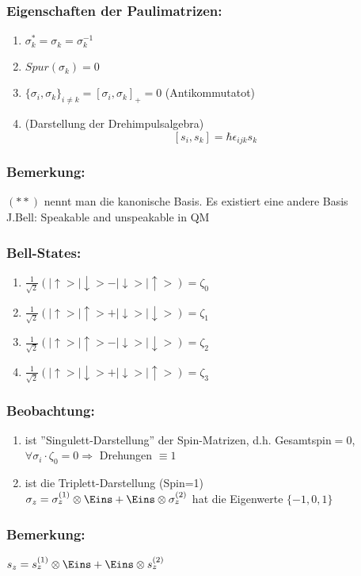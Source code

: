 \documentclass[twoside,a4paper]{scrartcl}
\renewcommand{\1}{\mathds{1}}
\newcommand{\Ra}{\Rightarrow}
\begin{document}
\subsubsection*{Eigenschaften der Paulimatrizen:}
\begin{enumerate}
\item $\sigma_k^*=\sigma_k=\sigma_k^{-1}$
\item $Spur(\sigma_k)=0$
\item $\{\sigma_i, \sigma_k\}_{i\neq k}=[\sigma_i, \sigma_k]_+=0$ (Antikommutatot)
\item (Darstellung der Drehimpulsalgebra)
$$[s_i,s_k]=\hbar \epsilon_{ijk} s_k$$
\end{enumerate}
\subsubsection*{Bemerkung:}
$(**)$ nennt man die kanonische Basis. Es existiert eine andere Basis\\
J.Bell: Speakable and unspeakable in QM
\subsubsection*{Bell-States:}
\begin{enumerate}
\item $\frac{1}{\sqrt{2}}(|\uparrow>|\downarrow>-|\downarrow>|\uparrow>)=\zeta_0$
\item $\frac{1}{\sqrt{2}}(|\uparrow>|\uparrow>+|\downarrow>|\downarrow>)=\zeta_1$
\item $\frac{1}{\sqrt{2}}(|\uparrow>|\uparrow>-|\downarrow>|\downarrow>)=\zeta_2$
\item $\frac{1}{\sqrt{2}}(|\uparrow>|\downarrow>+|\downarrow>|\uparrow>)=\zeta_3$
\end{enumerate}
\subsubsection*{Beobachtung:}
\begin{enumerate}
\item ist ''Singulett-Darstellung'' der Spin-Matrizen, d.h. Gesamtspin$=0$, $\forall \sigma_i \cdot \zeta_0=0 \Ra $ Drehungen $\equiv 1$
\item ist die Triplett-Darstellung (Spin=1)\\
$\sigma_z=\sigma_z^{(1)}\otimes \Eins+\Eins\otimes \sigma_z^{(2)}$ hat die Eigenwerte $\{-1,0,1\}$
\end{enumerate}
\subsubsection*{Bemerkung:}
$s_z=s_z^{(1)}\otimes \Eins+\Eins\otimes s_z^{(2)}$
\end{document}
